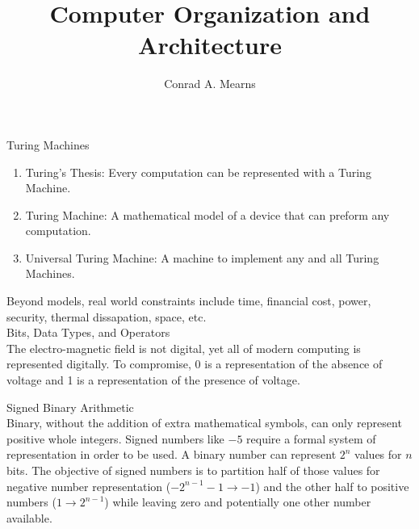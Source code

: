 \documentclass{article}
\title{Computer Organization and Architecture}
\author{Conrad A. Mearns}
\begin{document}
\maketitle

\noindent
\Large Turing Machines
\normalsize
\begin{enumerate}
  \item {Turing's Thesis: Every computation can be represented with a Turing Machine.}
  \item {Turing Machine: A mathematical model of a device that can preform any computation.}
  \item {Universal Turing Machine: A machine to implement any and all Turing Machines.}
\end{enumerate}

Beyond models, real world constraints include time, financial cost, power, security, thermal dissapation, space, etc.\\

\noindent
\Large Bits, Data Types, and Operators\\
\normalsize
\indent
The electro-magnetic field is not digital, yet all of modern computing is represented digitally. To compromise, 0 is a representation of the absence of voltage and 1 is a representation of the presence of voltage.

\centering
{}
\raggedright

\noindent
\Large
Signed Binary Arithmetic\\
\normalsize
\indent
Binary, without the addition of extra mathematical symbols, can only represent positive whole integers. Signed numbers like $-5$ require a formal system of representation in order to be used. A binary number can represent $2^n$ values for $n$ bits. The objective of signed numbers is to partition half of those values for negative number representation ($-2^{n-1}-1 \to -1$) and the other half to positive numbers ($1 \to 2^{n-1}$) while leaving zero and potentially one other number available.
\end{document}
